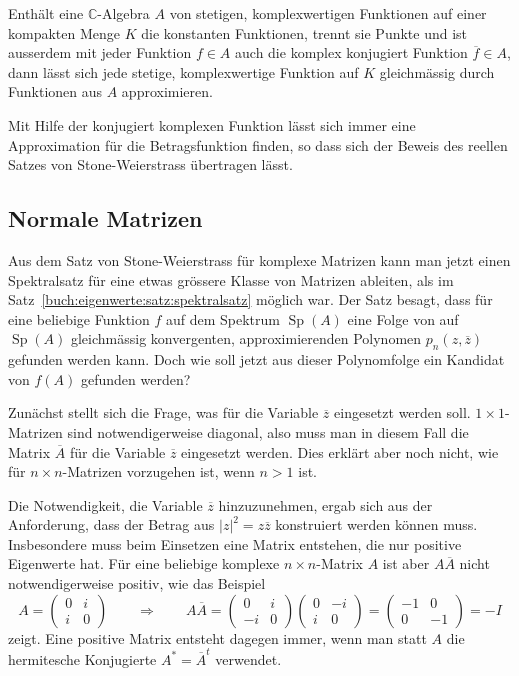 \begin{satz}
Enthält eine $\mathbb{C}$-Algebra $A$ von stetigen, komplexwertigen
Funktionen auf einer kompakten Menge $K$ die konstanten Funktionen,
trennt sie Punkte und ist ausserdem mit jeder Funktion $f\in A$ auch
die komplex konjugiert Funktion $\overline{f}\in A$,
dann lässt sich jede stetige, komplexwertige Funktion 
auf $K$ gleichmässig durch Funktionen aus $A$ approximieren.
\end{satz}

Mit Hilfe der konjugiert komplexen Funktion lässt sich immer eine
Approximation für die Betragsfunktion finden, so dass sich der
Beweis des reellen Satzes von Stone-Weierstrass übertragen lässt.

%
%
\subsection{Normale Matrizen
\label{buch:subsection:normale-matrizen}}
Aus dem Satz von Stone-Weierstrass für komplexe Matrizen kann man
jetzt einen Spektralsatz für eine etwas grössere Klasse von Matrizen
%
ableiten, als im Satz~\ref{buch:eigenwerte:satz:spektralsatz}
möglich war.
Der Satz besagt, dass für eine beliebige Funktion $f$ auf dem Spektrum
$\operatorname{Sp}(A)$ eine Folge von auf $\operatorname{Sp}(A)$
gleichmässig konvergenten, approximierenden Polynomen
$p_n(z,\overline{z})$ gefunden werden kann.
Doch wie soll jetzt aus dieser Polynomfolge ein Kandidat von $f(A)$
gefunden werden?

Zunächst stellt sich die Frage, was für die Variable $\overline{z}$ 
eingesetzt werden soll.
$1\times 1$-Matrizen sind notwendigerweise diagonal, also muss 
man in diesem Fall die Matrix $\overline{A}$ für die Variable
$\overline{z}$ eingesetzt werden.
Dies erklärt aber noch nicht, wie für $n\times n$-Matrizen
vorzugehen ist, wenn $n>1$ ist.

Die Notwendigkeit, die Variable $\overline{z}$ hinzuzunehmen,
ergab sich aus der Anforderung, dass der Betrag aus $|z|^2=z\overline{z}$
konstruiert werden können muss.
Insbesondere muss beim Einsetzen eine Matrix entstehen, die nur 
positive Eigenwerte hat.
Für eine beliebige komplexe $n\times n$-Matrix $A$ ist aber
$A\overline{A}$ nicht notwendigerweise positiv, wie das Beispiel
\[
A
=
\begin{pmatrix}0&i\\i&0\end{pmatrix}
\qquad
\Rightarrow
\qquad
A\overline{A}
=
\begin{pmatrix}0&i\\-i&0\end{pmatrix}
\begin{pmatrix}0&-i\\i&0\end{pmatrix}
=
\begin{pmatrix}
-1&0\\
 0&-1
\end{pmatrix}
=
-I
\]
zeigt.
Eine positive Matrix entsteht dagegen immer, wenn man statt
$A$ die hermitesche Konjugierte $A^*=\overline{A}^t$ verwendet.

